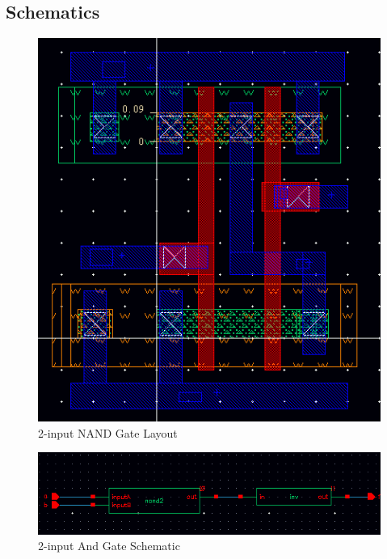 \documentclass[12pt]{article}
\begin{document}
\subsection{Schematics}
\begin{figure}[H]
	\centering
	\includegraphics[width=\linewidth]{nand2-layout}
	\caption{2-input NAND Gate Layout}
	\label{fig:nand2-layout}
\end{figure}

\begin{figure}[H]
\centering
\includegraphics[width=\linewidth]{and2-schematic}
\caption{2-input And Gate Schematic}
\label{fig:and2-schematic}
\end{figure}
\end{document}
